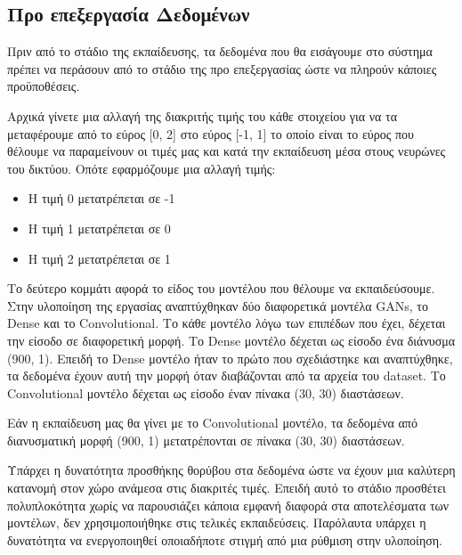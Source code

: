 \subsection{Προ επεξεργασία Δεδομένων}
Πριν από το στάδιο της εκπαίδευσης, τα δεδομένα που θα εισάγουμε στο σύστημα πρέπει να περάσουν από το στάδιο της προ επεξεργασίας ώστε να πληρούν κάποιες προϋποθέσεις.
\par
Αρχικά γίνετε μια αλλαγή της διακριτής τιμής του κάθε στοιχείου για να τα μεταφέρουμε από το εύρος [0, 2] στο εύρος [-1, 1] το οποίο είναι το εύρος που θέλουμε να παραμείνουν οι τιμές μας και κατά την εκπαίδευση μέσα στους νευρώνες του δικτύου. Οπότε εφαρμόζουμε μια αλλαγή τιμής:
\begin{itemize}
\item Η τιμή 0 μετατρέπεται σε -1
\item Η τιμή 1 μετατρέπεται σε 0
\item Η τιμή 2 μετατρέπεται σε 1
\end{itemize}

\par
Το δεύτερο κομμάτι αφορά το είδος του μοντέλου που θέλουμε να εκπαιδεύσουμε. Στην υλοποίηση της εργασίας αναπτύχθηκαν δύο διαφορετικά μοντέλα GANs, το Dense και το Convolutional. Το κάθε μοντέλο λόγω των επιπέδων που έχει, δέχεται την είσοδο σε διαφορετική μορφή. Το Dense μοντέλο δέχεται ως είσοδο ένα διάνυσμα (900, 1). Επειδή το Dense μοντέλο ήταν το πρώτο που σχεδιάστηκε και αναπτύχθηκε, τα δεδομένα έχουν αυτή την μορφή όταν διαβάζονται από τα αρχεία του dataset. Το Convolutional μοντέλο δέχεται ως είσοδο έναν πίνακα (30, 30) διαστάσεων.
\par
Εάν η εκπαίδευση μας θα γίνει με το Convolutional μοντέλο, τα δεδομένα από διανυσματική μορφή (900, 1) μετατρέπονται σε πίνακα (30, 30) διαστάσεων.

\par
Υπάρχει η δυνατότητα προσθήκης θορύβου στα δεδομένα ώστε να έχουν μια καλύτερη κατανομή στον χώρο ανάμεσα στις διακριτές τιμές. Επειδή αυτό το στάδιο προσθέτει πολυπλοκότητα χωρίς να παρουσιάζει κάποια εμφανή διαφορά στα αποτελέσματα των μοντέλων, δεν χρησιμοποιήθηκε στις τελικές εκπαιδεύσεις. Παρόλαυτα υπάρχει η δυνατότητα να ενεργοποιηθεί οποιαδήποτε στιγμή από μια ρύθμιση στην υλοποίηση.


